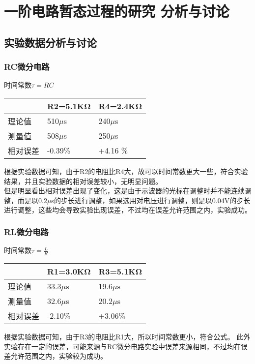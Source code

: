 \documentclass[dvipsnames, svgnames,a4paper,11pt]{article}
\begin{document}
	\section { 一阶电路暂态过程的研究 \quad \heiti 分析与讨论}
	
	\subsection{实验数据分析与讨论}
	
	\subsubsection{RC微分电路}
	时间常数$\tau=RC$
	\begin{table}[H]
		\centering
		\begin{tabular}{|l|l|l|}
		\hline
			~ & R2=5.1KΩ & R4=2.4KΩ \\ \hline
			理论值 & 510$\mu$s & 240$\mu$s \\ \hline
			测量值 & 508$\mu$s & 250$\mu$s \\ \hline
			相对误差 & -0.39\% & +4.16 \% \\ \hline
		\end{tabular}
	\end{table}
	根据实验数据可知，由于R2的电阻比R4大，故可以时间常数更大一些，符合实验结果，并且实验数据的相对误差较小，无明显问题。\\
	\indent 但是明显看出相对误差出现了变化，这是由于示波器的光标在调整时并不能连续调整，而是以0.2$\mu$s的步长进行调整，如果选用对电压进行调整，则是以0.04V的步长进行调整，这些均会导致实验出现误差，不过均在误差允许范围之内，实验成功。
	
	\subsubsection{RL微分电路}
	时间常数$\tau=\frac LR$
	\begin{table}[H]
		\centering
		\begin{tabular}{|l|l|l|}
		\hline
			~ & R1=3.0KΩ & R3=5.1KΩ \\ \hline
			理论值 & 33.3$\mu$s & 19.6$\mu$s \\ \hline
			测量值 & 32.6$\mu$s & 20.2$\mu$s \\ \hline
			相对误差 & -2.10\% & +3.06\% \\ \hline
		\end{tabular}
	\end{table}
	根据实验数据可知，由于R3的电阻比R1大，所以时间常数更小，符合公式。
	此外实验存在一定的误差，可能来源与RC微分电路实验中误差来源相同，不过均在误差允许范围之内，实验较为成功。
\end{document}

